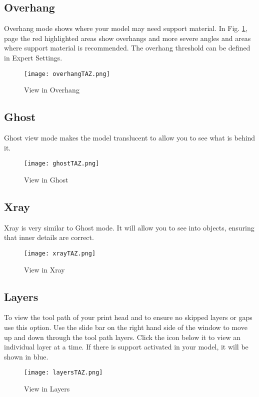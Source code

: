 \subsection{Overhang}
Overhang mode shows where your model may need support material. In Fig. \ref{fig:Overhang_View}, page \pageref{fig:Overhang_View} the red highlighted areas show overhangs and more severe angles and areas where support material is recommended. The overhang threshold can be defined in Expert Settings.
\begin{figure}[H]
\centering
\texttt{[image: overhangTAZ.png]}
\caption{View in Overhang}
\label{fig:Overhang_View}
\end{figure}

\subsection{Ghost}
Ghost view mode makes the model translucent to allow you to see what is behind it.
\begin{figure}[H]
\centering
\texttt{[image: ghostTAZ.png]}
\caption{View in Ghost}
\label{fig:Ghost View}
\end{figure}

\subsection{Xray}
Xray is very similar to Ghost mode. It will allow you to see into objects, ensuring that inner details are correct.
\begin{figure}[H]
\centering
\texttt{[image: xrayTAZ.png]}
\caption{View in Xray}
\label{fig:Xray View}
\end{figure}

\subsection{Layers}
To view the tool path of your print head and to ensure no skipped layers or gaps use this option. Use the slide bar on the right hand side of the window to move up and down through the tool path layers. Click the icon below it to view an individual layer at a time. If there is support activated in your model, it will be shown in blue.
\begin{figure}[H]
\centering
\texttt{[image: layersTAZ.png]}
\caption{View in Layers}
\label{fig:Layers View}
\end{figure}

